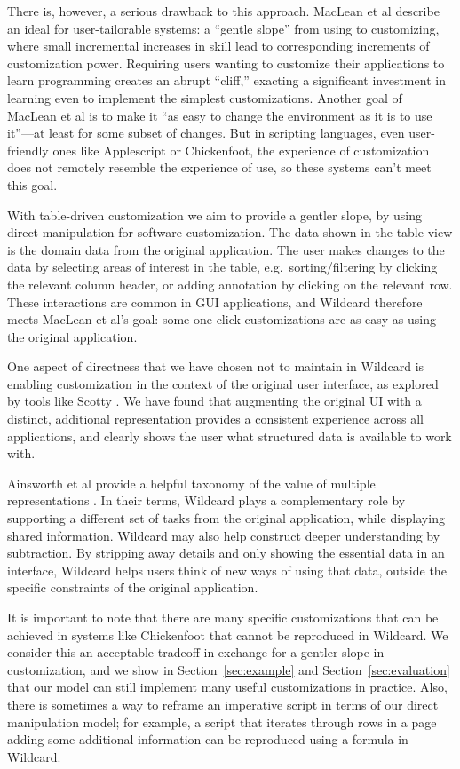 \documentclass[sigplan,screen,10pt,anonymous,review]{acmart}
\begin{document}
There is, however, a serious drawback to this approach. MacLean et al
\citep{maclean1990} describe an ideal for user-tailorable systems: a
``gentle slope'' from using to customizing, where small incremental
increases in skill lead to corresponding increments of customization
power. Requiring users wanting to customize their applications to learn
programming creates an abrupt ``cliff,'' exacting a significant
investment in learning even to implement the simplest customizations.
Another goal of MacLean et al is to make it ``as easy to change the
environment as it is to use it''---at least for some subset of changes.
But in scripting languages, even user-friendly ones like Applescript or
Chickenfoot, the experience of customization does not remotely resemble
the experience of use, so these systems can't meet this goal.

With table-driven customization we aim to provide a gentler slope, by
using direct manipulation for software customization. The data shown in
the table view is the domain data from the original application. The
user makes changes to the data by selecting areas of interest in the
table, e.g.~sorting/filtering by clicking the relevant column header, or
adding annotation by clicking on the relevant row. These interactions
are common in GUI applications, and Wildcard therefore meets MacLean et
al's goal: some one-click customizations are as easy as using the
original application.

One aspect of directness that we have chosen not to maintain in Wildcard
is enabling customization in the context of the original user interface,
as explored by tools like Scotty \citep{eagan2011}. We have found that
augmenting the original UI with a distinct, additional representation
provides a consistent experience across all applications, and clearly
shows the user what structured data is available to work with.

Ainsworth et al provide a helpful taxonomy of the value of multiple
representations \citep{ainsworth1999}. In their terms, Wildcard plays a
complementary role by supporting a different set of tasks from the
original application, while displaying shared information. Wildcard may
also help construct deeper understanding by subtraction. By stripping
away details and only showing the essential data in an interface,
Wildcard helps users think of new ways of using that data, outside the
specific constraints of the original application.

It is important to note that there are many specific customizations that
can be achieved in systems like Chickenfoot \citep{bolin2005} that
cannot be reproduced in Wildcard. We consider this an acceptable
tradeoff in exchange for a gentler slope in customization, and we show
in Section~\ref{sec:example} and Section~\ref{sec:evaluation} that our
model can still implement many useful customizations in practice. Also,
there is sometimes a way to reframe an imperative script in terms of our
direct manipulation model; for example, a script that iterates through
rows in a page adding some additional information can be reproduced
using a formula in Wildcard.
\end{document}
